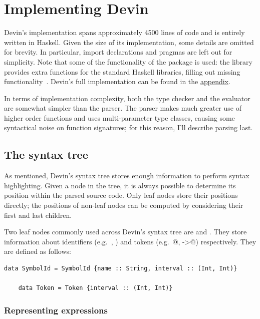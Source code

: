 \documentclass[UdineBachThesis,american,11pt]{PhdThesis}
\begin{document}
  \chapter{Implementing Devin}

  Devin's implementation spans approximately 4500 lines of code and is entirely
  written in Haskell. Given the size of its implementation, some details are
  omitted for brevity. In particular, import declarations and
  \lstinline@LANGUAGE@ pragmas are left out for simplicity. Note that some of
  the functionality of the package \lstinline@extra@ is used: the library
  provides extra functions for the standard Haskell libraries, filling out
  missing functionality~\cite{extra}. Devin's full implementation can be found
  in the \hyperref[chapter:devin-source-code]{appendix}.

  In terms of implementation complexity, both the type checker and the evaluator
  are somewhat simpler than the parser. The parser makes much greater use of
  higher order functions and uses multi-parameter type classes, causing some
  syntactical noise on function signatures; for this reason, I'll describe
  parsing last.

  \section{The syntax tree}

  As mentioned, Devin's syntax tree stores enough information to perform syntax
  highlighting. Given a node in the tree, it is always possible to determine its
  position within the parsed source code. Only leaf nodes store their positions
  directly; the positions of non-leaf nodes can be computed by considering their
  first and last children.

  Two leaf nodes commonly used across Devin's syntax tree are
  \lstinline@SymbolId@ and \lstinline@Token@. They store information about
  identifiers (e.g.\ \lstinline@x@, \lstinline@Int@) and tokens (e.g.\
  @, \lstinline@->@) respectively. They are defined
  as follows:

  \begin{lstlisting}[gobble=4,basicstyle=\ttfamily\small]
    data SymbolId = SymbolId {name :: String, interval :: (Int, Int)}

    data Token = Token {interval :: (Int, Int)}
  \end{lstlisting}

  \subsection{Representing expressions}
\end{document}

